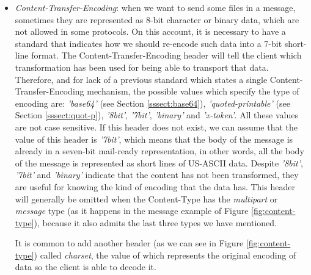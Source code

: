 \begin{itemize}
	\item\textit{Content-Transfer-Encoding}: when we want to send some files in a message, sometimes they are represented as 8-bit character or binary data, which are not allowed in some protocols. On this account, it is necessary to have a standard that indicates how we should re-encode such data into a 7-bit short-line format. The Content-Transfer-Encoding header \citep[Section 5]{rfc1341} will tell the client which transformation has been used for being able to transport that data. Therefore, and for lack of a previous standard which states a single Content-Transfer-Encoding mechanism, the possible values which specify the type of encoding are: \textit{'base64'} (see Section \ref{sssect:base64}), \textit{'quoted-printable'} (see Section \ref{sssect:quot-p}), \textit{'8bit'}, \textit{'7bit'}, \textit{'binary'} and \textit{'x-token'}. All these values are not case sensitive. If this header does not exist, we can assume that the value of this header is \textit{'7bit'}, which means that the body of the message is already in a seven-bit mail-ready representation, in other words, all the body of the message is represented as short lines of US-ASCII data. Despite \textit{'8bit'}, \textit{'7bit'} and \textit{'binary'} indicate that the content has not been transformed, they are useful for knowing the kind of encoding that the data has. This header will generally be omitted when the Content-Type has the \textit{multipart} or \textit{message} type (as it happens in the message example of Figure \ref{fig:content-type}), because it also admits the last three types we have mentioned.
	
	It is common to add another header (as we can see in Figure \ref{fig:content-type}) called \textit{charset}, the value of which represents the original encoding of data so the client is able to decode it.
\end{itemize}

